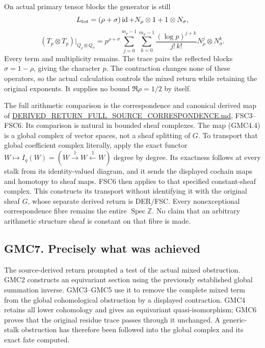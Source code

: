 On actual primary tensor blocks the generator is still \[
L_{\rm tot}=(\rho+\sigma)\operatorname{id}
+N_\rho\otimes1+1\otimes N_\sigma,
\] \[
(T_p\otimes T_p)|_{Q_\rho\otimes Q_\sigma}
=p^{\rho+\sigma}
\sum_{j=0}^{m_\rho-1}\sum_{k=0}^{m_\sigma-1}
\frac{(\log p)^{j+k}}{j!\,k!}N_\rho^j\otimes N_\sigma^k.
\tag{GMC6.3}
\] Every term and multiplicity remains. The trace pairs the reflected
blocks \(\sigma=1-\rho\), giving the character \(p\). The contraction
changes none of these operators, so the actual calculation controls the
mixed return while retaining the original exponents. It supplies no
bound \(\Re\rho=1/2\) by itself.

The full arithmetic comparison is the correspondence and canonical
derived map of
\href{https://github.com/KokunoYumeto/zeta-function-research-reader/blob/main/workbenches/splitzero-tandem/continuations/20260925-full-source-tensor-and-original-divisor/counterfactual/DERIVED_RETURN_FULL_SOURCE_CORRESPONDENCE.md}{DERIVED\_RETURN\_FULL\_SOURCE\_CORRESPONDENCE.md},
FSC3--FSC6. Its comparison is natural in bounded sheaf complexes. The
map (GMC4.4) is a global complex of vector spaces, not a sheaf splitting
of \(G\). To transport that global coefficient complex literally, apply
the exact functor
\(W\mapsto I_\eta(W)=(W\xrightarrow{1}W\xleftarrow{1}W)\) degree by
degree. Its exactness follows at every stalk from its identity-valued
diagram, and it sends the displayed cochain maps and homotopy to sheaf
maps. FSC6 then applies to that specified constant-sheaf complex. This
constructs its transport without identifying it with the original sheaf
\(G\), whose separate derived return is DER/FSC. Every nonexceptional
correspondence fibre remains the entire
\(\operatorname{Spec}\mathbb Z\). No claim that an arbitrary arithmetic
structure sheaf is constant on that fibre is made.

\subsection{GMC7. Precisely what was
achieved}\label{gmc7.-precisely-what-was-achieved}

The source-derived return prompted a test of the actual mixed
obstruction. GMC2 constructs an equivariant section using the previously
established global summation inverse. GMC3--GMC5 use it to remove the
complete mixed term from the global cohomological obstruction by a
displayed contraction. GMC4 retains all lower cohomology and gives an
equivariant quasi-isomorphism; GMC6 proves that the original residue
trace passes through it unchanged. A generic-stalk obstruction has
therefore been followed into the global complex and its exact fate
computed.

